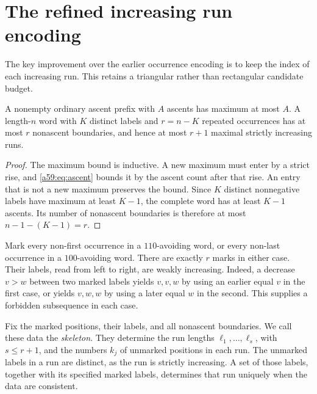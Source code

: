 \documentclass[11pt,letterpaper]{article}
\theoremstyle{remark}\newtheorem{remark}[theorem]{Remark}
\theoremstyle{remark}\newtheorem{wremark}{Remark}\renewcommand{\thewremark}{W\arabic{wremark}}
\theoremstyle{plain}\newtheorem{wcorollary}[wremark]{Corollary}
\begin{document}
\section{The refined increasing run encoding}\label{a59:sec:upper}
The key improvement over the earlier occurrence encoding is to keep the index of each increasing run. This retains a triangular rather than rectangular candidate budget.

\begin{lemma}\label{a59:lem:prefix}
A nonempty ordinary ascent prefix with $A$ ascents has maximum at most $A$. A length-$n$ word with $K$ distinct labels and $r=n-K$ repeated occurrences has at most $r$ nonascent boundaries, and hence at most $r+1$ maximal strictly increasing runs.
\end{lemma}
\begin{proof}
The maximum bound is inductive. A new maximum must enter by a strict rise, and \eqref{a59:eq:ascent} bounds it by the ascent count after that rise. An entry that is not a new maximum preserves the bound. Since $K$ distinct nonnegative labels have maximum at least $K-1$, the complete word has at least $K-1$ ascents. Its number of nonascent boundaries is therefore at most $n-1-(K-1)=r$.
\end{proof}

Mark every non-first occurrence in a $110$-avoiding word, or every non-last occurrence in a $100$-avoiding word. There are exactly $r$ marks in either case. Their labels, read from left to right, are weakly increasing. Indeed, a decrease $v>w$ between two marked labels yields $v,v,w$ by using an earlier equal $v$ in the first case, or yields $v,w,w$ by using a later equal $w$ in the second. This supplies a forbidden subsequence in each case.

Fix the marked positions, their labels, and all nonascent boundaries. We call these data the \emph{skeleton}. They determine the run lengths $\ell_1,\ldots,\ell_s$, with $s\le r+1$, and the numbers $k_j$ of unmarked positions in each run. The unmarked labels in a run are distinct, as the run is strictly increasing. A set of those labels, together with its specified marked labels, determines that run uniquely when the data are consistent.
\end{document}
